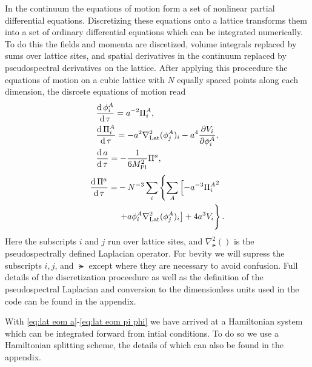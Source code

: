 In the continuum the equations of motion form a set of nonlinear partial differential equations. Discretizing these equations onto a lattice transforms them into a set of ordinary differential equations which can be integrated numerically. To do this the fields and momenta are discetized, volume integrals replaced by sums over lattice sites, and spatial derivatives in the continuum replaced by pseudospectral derivatives on the lattice. After applying this proceedure the equations of motion on a cubic lattice with $N$ equally spaced points along each dimension, the disrcete equations of motion read
\begin{align}
  & \frac{\mathrm{d}\,\phi^A_i}{\mathrm{d}\,\tau} = a^{-2}\Pi^A_i,  \label{eq:lat eom a}\\
  & \frac{\mathrm{d}\,\Pi^A_i}{\mathrm{d}\,\tau} = -a^2\nabla^2_{\mathrm{Lat}}(\phi^A_j)_i -a^4\frac{\partial V_i}{\partial \phi^A_i},  \label{eq:lat eom pi a}\\
  & \frac{\mathrm{d}\, a}{\mathrm{d}\,\tau} = -\frac{1}{6M_{\mathrm{Pl}}^2}\Pi^a,  \label{eq:lat eom phi}
\end{align}
\begin{align}
  \begin{split}
    \frac{\dd\Pi^a}{\dd\tau} = &-N^{-3}\sum_i\left\{
    \sum_A\left[-a^{-3}{\Pi^A_i}^2 \right.\right. \\
    &  \left.\left. + a\phi^A_i\nabla^2_\lat(\phi^A_j)_i \right]%
    + 4a^3V_i\vphantom{\sum_A}\right\}.
  \end{split} \label{eq:lat eom pi phi}  
\end{align}
Here the subscripts $i$ and $j$ run over lattice sites, and $\nabla^2_\lat()$ is the pseudospectrally defined Laplacian operator.
For bevity we will supress the subscripts $i,j$, and $\lat$ except where they are necessary to avoid confusion.
Full details of the discretization proceedure as well as the definition of the pseudospectral Laplacian and conversion to the dimensionless units used in the code can be found in the appendix.

With \eqref{eq:lat eom a}-\eqref{eq:lat eom pi phi} we have arrived at a Hamiltonian system which can be integrated forward from intial conditions. To do so we use a Hamiltonian splitting scheme, the details of which can also be found in the appendix.

